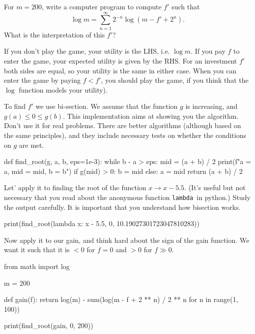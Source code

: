 \begin{exercise}
For $m=200$, write a computer program to compute $f'$ such that
\begin{equation}
  \label{eq:136}
\log m =  \sum_{n=1}^{\infty} 2^{-n}\log(m - f' + 2^{n}).
 \end{equation}
What is the interpretation of this $f'$?
\begin{solution}
  If you don't play the game, your utility is the LHS, i.e. $\log m$.
  If you pay $f$ to enter the game, your expected utility is given by the RHS.
  For an investment $f'$ both sides are equal, so your utility is the same in either case.
  When you can enter the game by paying $f<f'$, you should play the game, if you think that the $\log$ function models your utility).


  To find $f'$ we use bi-section.
  We assume that the function $g$ is increasing, and $g(a) \leq 0 \leq g(b)$.
  This implementation aims at showing you the algorithm.
  Don't use it for real problems.
  There are better algorithms (although based on the same principles), and they include necessary tests on whether the conditions on $g$ are met.

\begin{samepage}
\begin{pyblock}
def find_root(g, a, b, eps=1e-3):
    while b - a > eps:
        mid = (a + b) / 2
        print(f"a = {a}, mid = {mid}, b = {b}\n")
        if g(mid) > 0:
            b = mid
        else:
            a = mid
    return (a + b) / 2
\end{pyblock}
\end{samepage}


Let' apply it to finding the root of the function $x\to x-5.5$.
(It's useful but not necessary that you read about the anonymous function \texttt{lambda }in python.)
Study the output carefully.
It is important that you understand how bisection works.
\begin{pyblock}
print(find_root(lambda x: x - 5.5, 0, 10.19027301723047810283))
\end{pyblock}

\printpythontex

\begin{samepage}

Now apply it to our gain, and think hard about the sign of the gain function. We want it such that it is $<0$ for $f=0$ and $>0$ for $f\gg 0$.
\begin{pyblock}
from math import log

m = 200

def gain(f):
    return log(m) - sum(log(m - f + 2 ** n) / 2 ** n for n in range(1, 100))


print(find_root(gain, 0, 200))
\end{pyblock}

\end{samepage}

\printpythontex

\end{solution}
\end{exercise}



